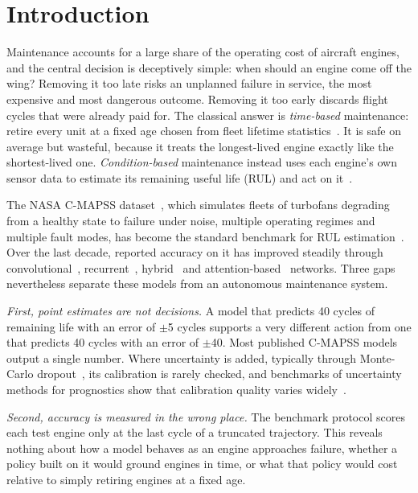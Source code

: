 \section{Introduction}
\label{sec:intro}

Maintenance accounts for a large share of the operating cost of aircraft
engines, and the central decision is deceptively simple: when should an engine
come off the wing? Removing it too late risks an unplanned failure in service,
the most expensive and most dangerous outcome. Removing it too early discards
flight cycles that were already paid for. The classical answer is
\emph{time-based} maintenance: retire every unit at a fixed age chosen from
fleet lifetime statistics~\cite{barlow1960optimum}. It is safe on average but
wasteful, because it treats the longest-lived engine exactly like the
shortest-lived one. \emph{Condition-based} maintenance instead uses each
engine's own sensor data to estimate its remaining useful life (RUL) and act on
it~\cite{jardine2006review,lei2018review}.

The NASA C-MAPSS dataset~\cite{saxena2008damage}, which simulates fleets of
turbofans degrading from a healthy state to failure under noise, multiple
operating regimes and multiple fault modes, has become the standard benchmark
for RUL estimation~\cite{ramasso2014benchmark}. Over the last decade, reported
accuracy on it has improved steadily through convolutional~\cite{babu2016cnn,li2018dcnn},
recurrent~\cite{zheng2017lstm}, hybrid~\cite{aldulaimi2019hdnn} and
attention-based~\cite{ragab2020ats2s} networks. Three gaps nevertheless separate
these models from an autonomous maintenance system.

\emph{First, point estimates are not decisions.} A model that predicts 40
cycles of remaining life with an error of $\pm$5 cycles supports a very
different action from one that predicts 40 cycles with an error of $\pm$40.
Most published C-MAPSS models output a single number. Where uncertainty is
added, typically through Monte-Carlo dropout~\cite{gal2016dropout}, its
calibration is rarely checked, and benchmarks of uncertainty methods for
prognostics show that calibration quality varies widely~\cite{basora2023uqbench}.

\emph{Second, accuracy is measured in the wrong place.} The benchmark protocol
scores each test engine only at the last cycle of a truncated trajectory. This
reveals nothing about how a model behaves as an engine approaches failure,
whether a policy built on it would ground engines in time, or what that policy
would cost relative to simply retiring engines at a fixed age.

